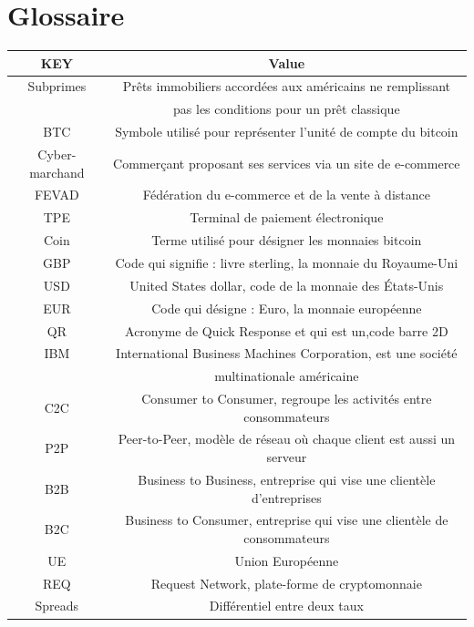 \documentclass[12pt]{report}
\begin{document}
\section{Glossaire}
\begin{tabular}{|c|c|}
\hline 
\rowcolor{green}KEY & Value \\

\hline
Subprimes & Prêts immobiliers accordées aux américains ne remplissant \\ & pas les conditions pour un prêt classique \\ 

\hline 
BTC & Symbole utilisé pour représenter l'unité de compte du bitcoin \\

\hline
Cyber-marchand & Commerçant proposant ses services via un site de e-commerce \\

\hline
FEVAD & Fédération du e-commerce et de la vente à distance\\

\hline
TPE & Terminal de paiement électronique\\

\hline
Coin & Terme utilisé pour désigner les monnaies bitcoin\\

\hline
GBP & Code qui signifie : livre sterling, la monnaie du Royaume-Uni\\

\hline
USD & United States dollar, code de la monnaie des États-Unis \\

\hline
EUR & Code qui désigne : Euro, la monnaie européenne \\

\hline
QR & Acronyme de Quick Response et qui est un,code barre 2D\\

\hline
IBM & International Business Machines Corporation, est une société \\ & multinationale américaine\\

\hline
C2C & Consumer to Consumer, regroupe les activités entre consommateurs\\  

\hline
P2P & Peer-to-Peer, modèle de réseau où chaque client est aussi un serveur\\

\hline
B2B & Business to Business, entreprise qui vise une clientèle d'entreprises\\

\hline
B2C & Business to Consumer, entreprise qui vise une clientèle de consommateurs\\

\hline
UE & Union Européenne \\

\hline
REQ & Request Network, plate-forme de cryptomonnaie\\

\hline
Spreads & Différentiel entre deux taux\\

\hline 
\end{tabular} 
\end{document}

